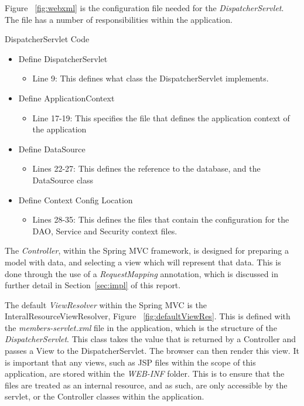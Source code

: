 Figure ~\ref{fig:webxml} is the configuration file needed for the \textit{DispatcherServlet}. The file has a number of responsibilities within the application.

\begin{table}[H]
\caption{DispatcherServlet Code}
\begin{itemize}
\item Define DispatcherServlet
\begin{itemize}
\item Line 9: This defines what class the DispatcherServlet implements.
\end{itemize}
\item Define ApplicationContext
\begin{itemize}
\item Line 17-19: This specifies the file that defines the application context of the application
\end{itemize}
\item Define DataSource
\begin{itemize}
\item Lines 22-27: This defines the reference to the database, and the DataSource class
\end{itemize}
\item Define Context Config Location
\begin{itemize}
\item Lines 28-35: This defines the files that contain the configuration for the DAO, Service and Security context files.
\end{itemize}
\end{itemize}
\label{fig:webxmlExplain}
\end{table}

The \textit{Controller}, within the Spring MVC framework, is designed for preparing a model with data, and selecting a view which will represent that data. This is done through the use of a \textit{RequestMapping} annotation, which is discussed in further detail in Section~\ref{sec:impl} of this report.

The default \textit{ViewResolver} within the Spring MVC is the InteralResourceViewResolver, Figure ~\ref{fig:defaultViewRes}. This is defined with the \textit{members-servlet.xml} file in the application, which is the structure of the \textit{DispatcherServlet}. This class takes the value that is returned by a Controller and passes a View to the DispatcherServlet. The browser can then render this view. It is important that any views, such as JSP files within the scope of this application, are stored within the \textit{WEB-INF} folder. This is to ensure that the files are treated as an internal resource, and as such, are only accessible by the servlet, or the Controller classes within the application.

